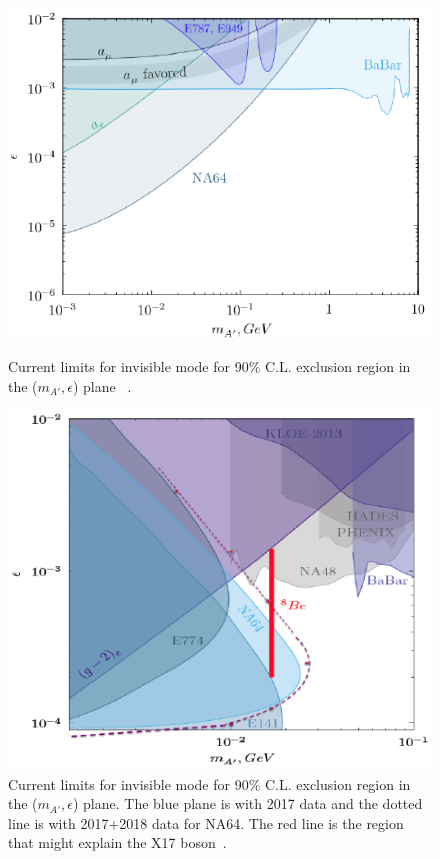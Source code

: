 \begin{figure}[t!]
\centering
  \begin{minipage}[t]{.45\textwidth}
    \centering
    \includegraphics[width=\textwidth]{thesis_figures/exclusion_invisible.png}
    \caption{Current limits for invisible mode for 90\% C.L. exclusion region in the ($m_{A'},\epsilon$) plane ~\cite{2019EPJWC.21206005K}.}
    \label{fig:exclusion_invisible}
  \end{minipage}
  \hfill
  \begin{minipage}[t]{.45\textwidth}
    \centering
    \includegraphics[width=\linewidth]{thesis_figures/exclusion_visible_latest.png}
    \caption{Current limits for invisible mode for 90\% C.L. exclusion region in the ($m_{A'},\epsilon$) plane. The blue plane is with 2017 data and the dotted line is with 2017+2018 data for NA64. The red line is the region that might explain the X17 boson~\cite{2019EPJWC.21206005K}.}
    \label{fig:exclusion_visible}
  \end{minipage}
\end{figure}


